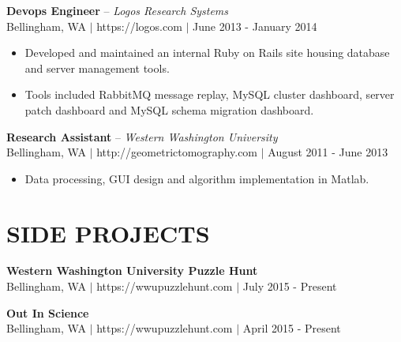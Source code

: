 \documentclass[line,margin]{res}
\begin{document}
\begin{resume}
    {\bf Devops Engineer} -- {\sl Logos Research Systems} \\
    {\footnotesize Bellingham, WA $|$ https://logos.com $|$ June 2013 - January 2014}
    \begin{itemize} \itemsep -2pt
        \item Developed and maintained an internal Ruby on Rails site housing database and server management tools.
        \item Tools included RabbitMQ message replay, MySQL cluster dashboard, server patch dashboard and MySQL schema migration dashboard.
    \end{itemize}

    {\bf Research Assistant} -- {\sl Western Washington University} \\
    {\footnotesize Bellingham, WA $|$ http://geometrictomography.com $|$ August 2011 - June 2013}
    \begin{itemize}  \itemsep -2pt
        \item Data processing, GUI design and algorithm implementation in Matlab.
    \end{itemize}



\newpage

\section{SIDE PROJECTS}
    {\bf Western Washington University Puzzle Hunt} \\
    {\footnotesize Bellingham, WA $|$ https://wwupuzzlehunt.com $|$ July 2015 - Present}

    {\bf Out In Science} \\
    {\footnotesize Bellingham, WA $|$ https://wwupuzzlehunt.com $|$ April 2015 - Present}


\end{resume}
\end{document}
